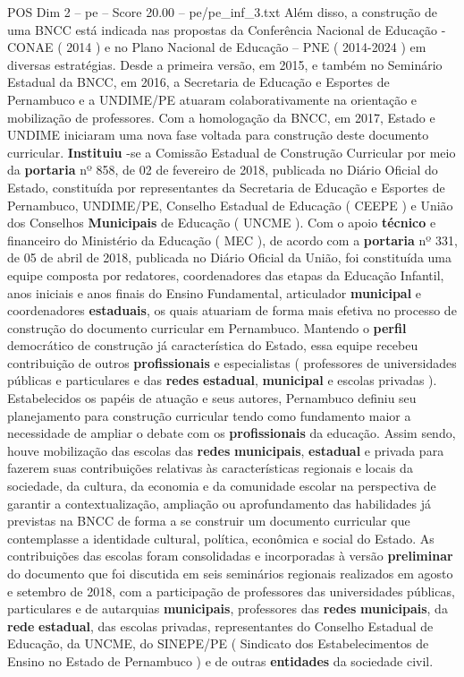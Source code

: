 \begin{textsample}{POS Dim 2 – pe – Score 20.00 – pe/pe\_inf\_3.txt}
Além disso, a construção de uma BNCC está indicada nas propostas da Conferência Nacional de Educação - CONAE ( 2014 ) e no Plano Nacional de Educação – PNE ( 2014-2024 ) em diversas estratégias.
Desde a primeira versão, em 2015, e também no Seminário Estadual da BNCC, em 2016, a Secretaria de Educação e Esportes de Pernambuco e a UNDIME/PE atuaram colaborativamente na orientação e mobilização de professores.
Com a homologação da BNCC, em 2017, Estado e UNDIME iniciaram uma nova fase voltada para construção deste documento curricular. \textbf{Instituiu} -se a Comissão Estadual de Construção Curricular por meio da \textbf{portaria} nº 858, de 02 de fevereiro de 2018, publicada no Diário Oficial do Estado, constituída por representantes da Secretaria de Educação e Esportes de Pernambuco, UNDIME/PE, Conselho Estadual de Educação ( CEEPE ) e União dos Conselhos \textbf{Municipais} de Educação ( UNCME ).
Com o apoio \textbf{técnico} e financeiro do Ministério da Educação ( MEC ), de acordo com a \textbf{portaria} nº 331, de 05 de abril de 2018, publicada no Diário Oficial da União, foi constituída uma equipe composta por redatores, coordenadores das etapas da Educação Infantil, anos iniciais e anos finais do Ensino Fundamental, articulador \textbf{municipal} e coordenadores \textbf{estaduais}, os quais atuariam de forma mais efetiva no processo de construção do documento curricular em Pernambuco.
Mantendo o \textbf{perfil} democrático de construção já característica do Estado, essa equipe recebeu contribuição de outros \textbf{profissionais} e especialistas ( professores de universidades públicas e particulares e das \textbf{redes} \textbf{estadual}, \textbf{municipal} e escolas privadas ).
Estabelecidos os papéis de atuação e seus autores, Pernambuco definiu seu planejamento para construção curricular tendo como fundamento maior a necessidade de ampliar o debate com os \textbf{profissionais} da educação.
Assim sendo, houve mobilização das escolas das \textbf{redes} \textbf{municipais}, \textbf{estadual} e privada para fazerem suas contribuições relativas às características regionais e locais da sociedade, da cultura, da economia e da comunidade escolar na perspectiva de garantir a contextualização, ampliação ou aprofundamento das habilidades já previstas na BNCC de forma a se construir um documento curricular que contemplasse a identidade cultural, política, econômica e social do Estado.
As contribuições das escolas foram consolidadas e incorporadas à versão \textbf{preliminar} do documento que foi discutida em seis seminários regionais realizados em agosto e setembro de 2018, com a participação de professores das universidades públicas, particulares e de autarquias \textbf{municipais}, professores das \textbf{redes} \textbf{municipais}, da \textbf{rede} \textbf{estadual}, das escolas privadas, representantes do Conselho Estadual de Educação, da UNCME, do SINEPE/PE ( Sindicato dos Estabelecimentos de Ensino no Estado de Pernambuco ) e de outras \textbf{entidades} da sociedade civil.

\end{textsample}
